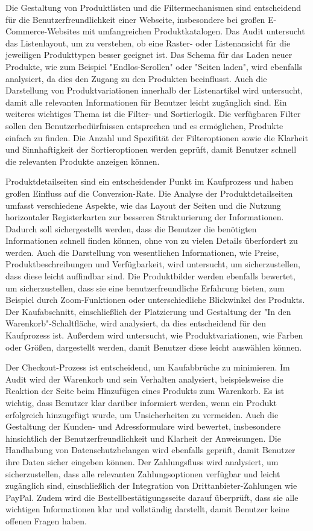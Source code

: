 Die Gestaltung von Produktlisten und die Filtermechanismen sind entscheidend für die Benutzerfreundlichkeit einer Webseite, insbesondere bei großen E-Commerce-Websites mit umfangreichen Produktkatalogen. Das Audit untersucht das Listenlayout, um zu verstehen, ob eine Raster- oder Listenansicht für die jeweiligen Produkttypen besser geeignet ist. Das Schema für das Laden neuer Produkte, wie zum Beispiel "Endlos-Scrollen" oder "Seiten laden", wird ebenfalls analysiert, da dies den Zugang zu den Produkten beeinflusst. Auch die Darstellung von Produktvariationen innerhalb der Listenartikel wird untersucht, damit alle relevanten Informationen für Benutzer leicht zugänglich sind. Ein weiteres wichtiges Thema ist die Filter- und Sortierlogik. Die verfügbaren Filter sollen den Benutzerbedürfnissen entsprechen und es ermöglichen, Produkte einfach zu finden. Die Anzahl und Spezifität der Filteroptionen sowie die Klarheit und Sinnhaftigkeit der Sortieroptionen werden geprüft, damit Benutzer schnell die relevanten Produkte anzeigen können.

Produktdetailseiten sind ein entscheidender Punkt im Kaufprozess und haben großen Einfluss auf die Conversion-Rate. Die Analyse der Produktdetailseiten umfasst verschiedene Aspekte, wie das Layout der Seiten und die Nutzung horizontaler Registerkarten zur besseren Strukturierung der Informationen. Dadurch soll sichergestellt werden, dass die Benutzer die benötigten Informationen schnell finden können, ohne von zu vielen Details überfordert zu werden. Auch die Darstellung von wesentlichen Informationen, wie Preise, Produktbeschreibungen und Verfügbarkeit, wird untersucht, um sicherzustellen, dass diese leicht auffindbar sind. Die Produktbilder werden ebenfalls bewertet, um sicherzustellen, dass sie eine benutzerfreundliche Erfahrung bieten, zum Beispiel durch Zoom-Funktionen oder unterschiedliche Blickwinkel des Produkts. Der Kaufabschnitt, einschließlich der Platzierung und Gestaltung der "In den Warenkorb"-Schaltfläche, wird analysiert, da dies entscheidend für den Kaufprozess ist. Außerdem wird untersucht, wie Produktvariationen, wie Farben oder Größen, dargestellt werden, damit Benutzer diese leicht auswählen können.

Der Checkout-Prozess ist entscheidend, um Kaufabbrüche zu minimieren. Im Audit wird der Warenkorb und sein Verhalten analysiert, beispielsweise die Reaktion der Seite beim Hinzufügen eines Produkts zum Warenkorb. Es ist wichtig, dass Benutzer klar darüber informiert werden, wenn ein Produkt erfolgreich hinzugefügt wurde, um Unsicherheiten zu vermeiden. Auch die Gestaltung der Kunden- und Adressformulare wird bewertet, insbesondere hinsichtlich der Benutzerfreundlichkeit und Klarheit der Anweisungen. Die Handhabung von Datenschutzbelangen wird ebenfalls geprüft, damit Benutzer ihre Daten sicher eingeben können. Der Zahlungsfluss wird analysiert, um sicherzustellen, dass alle relevanten Zahlungsoptionen verfügbar und leicht zugänglich sind, einschließlich der Integration von Drittanbieter-Zahlungen wie PayPal. Zudem wird die Bestellbestätigungsseite darauf überprüft, dass sie alle wichtigen Informationen klar und vollständig darstellt, damit Benutzer keine offenen Fragen haben.

